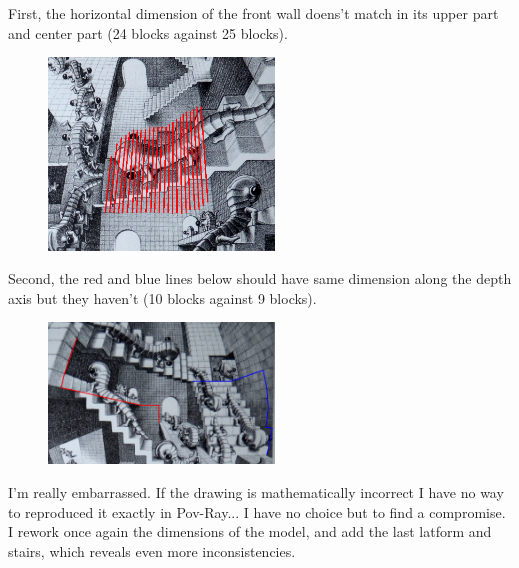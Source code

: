 \documentclass[12pt, a4paper]{article}
\begin{document}
First, the horizontal dimension of the front wall doens't match in its upper part and center part (24 blocks against 25 blocks).\\

\begin{center}
\begin{figure}[H]
\centering
\includegraphics[width=6cm]{./inconsistency_1.png}\\
\end{figure}
\end{center}

Second, the red and blue lines below should have same dimension along the depth axis but they haven't (10 blocks against 9 blocks).\\

\begin{center}
\begin{figure}[H]
\centering
\includegraphics[width=6cm]{./inconsistency_2.png}\\
\end{figure}
\end{center}

I'm really embarrassed. If the drawing is mathematically incorrect I have no way to reproduced it exactly in Pov-Ray... I have no choice but to find a compromise. I rework once again the dimensions of the model, and add the last latform and stairs, which reveals even more inconsistencies.\\

\begin{scriptsize}
\begin{ttfamily}

\end{ttfamily}
\end{scriptsize}
\end{document}
